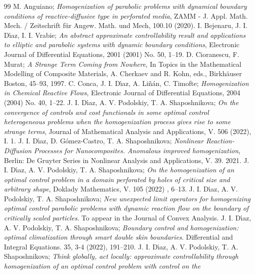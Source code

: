 \documentclass[10pt,a4paper]{amsart}
\numberwithin{equation}{section}
\begin{document}
\begin{thebibliography}{99}
  M. Anguiano;
\emph{Homogenization of parabolic problems with
dynamical boundary conditions of reactive-diffusive type in perforated
media}, ZAMM - J. Appl. Math. Mech. / Zeitschrift f\"{u}r Angew. Math. und
Mech, 100.10 (2020).
  I. Bejenaru, J. I. D\'{\i}az, I. I. Vrabie;
\emph{An abstract approximate controllability result and applications to elliptic
and parabolic systems with dynamic boundary conditions}, Electronic Journal of
Differential Equations, 2001 (2001) No. 50, 1--19.
  D. Cioranescu, F. Murat;
\emph{A Strange Term Coming from Nowhere}, 
In Topics in the Mathematical Modelling of Composite
Materials, A. Cherkaev and R. Kohn, eds., Birkh{\"{a}}user Boston, 45--93,
1997.
  C. Conca, J. I. D\'{\i}az, A. Li\~{n}\'{a}n,  C. Timofte;
\emph{Homogenization in Chemical Reactive Flows}, Electronic Journal of
Differential Equations, 2004 (2004) No. 40, 1--22.
  J. I. D\'{\i}az, A. V. Podolskiy, T. A. Shaposhnikova;
\emph{On the convergence of controls and cost functionals in some
optimal control heterogeneous problems when the homogenization process gives
rise to some strange terms}, Journal of Mathematical Analysis and
Applications, V. 506 (2022), I. 1.
  J. I. D\'{\i}az, D. G\'{o}mez-Castro, T. A. Shaposhnikova;
\emph{Nonlinear Reaction-Diffusion Processes for Nanocomposites.
Anomalous improved homogenization}, Berlin: De Gruyter Series in Nonlinear
Analysis and Applications, V. 39. 2021.
  J. I. D\'{\i}az, A. V. Podolskiy,  T. A. Shaposhnikova;
\emph{On the homogenization of an optimal control problem in a
domain perforated by holes of critical size and arbitrary shape}, 
Doklady Mathematics, V. 105 (2022) , 6--13.
  J. I. D\'{\i}az, A. V. Podolskiy,  T. A. Shaposhnikova;
\emph{New unexpected limit operators for homogenizing optimal
control parabolic problems with dynamic reaction flow on the boundary of
critically scaled particles}. To appear in the Journal of Convex Analysis.
  J. I. D\'{\i}az, A. V. Podolskiy, T. A. Shaposhnikova;
\emph{Boundary control and homogenization: optimal climatization
through smart double skin boundaries}. Differential and Integral Equations.
35, 3-4 (2022), 191--210.
  J. I. D\'{\i}az, A. V. Podolskiy, T. A. Shaposhnikova;
\emph{Think globally, act locally: approximate controllability
through homogenization of an optimal control problem with control on the
}
\end{thebibliography}
\end{document}
